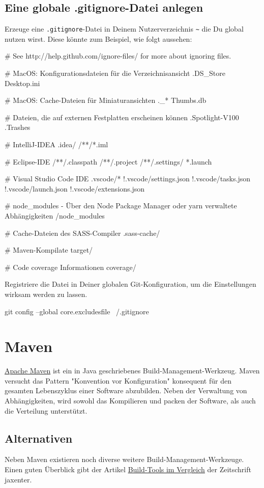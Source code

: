 \documentclass[]{article}
\newcommand{\code}[1]{\texttt{#1}}
\begin{document}
\subsection{Eine globale .gitignore-Datei anlegen}
Erzeuge eine \code{.gitignore}-Datei in Deinem Nutzerverzeichnis \code{\~} die Du global nutzen wirst. Diese könnte zum Beispiel, wie folgt aussehen:
\begin{bashcode}
 # See http://help.github.com/ignore-files/ for more about ignoring files.
 
# MacOS: Konfigurationsdateien für die Verzeichnisansicht
.DS_Store
Desktop.ini

# MacOS: Cache-Dateien für Miniaturansichten
._*
Thumbs.db

# Dateien, die auf externen Festplatten erscheinen können
.Spotlight-V100
.Trashes

# IntelliJ-IDEA
.idea/
/**/*.iml

# Eclipse-IDE
/**/.classpath
/**/.project
/**/.settings/
*.launch

 # Visual Studio Code IDE
.vscode/*
!.vscode/settings.json
!.vscode/tasks.json
!.vscode/launch.json
!.vscode/extensions.json

# node_modules - Über den Node Package Manager oder yarn verwaltete Abhängigkeiten
/node_modules

# Cache-Dateien des SASS-Compiler
.sass-cache/

# Maven-Kompilate
target/

# Code coverage Informationen
coverage/

\end{bashcode}

Registriere die Datei in Deiner globalen Git-Konfiguration, um die Einstellungen wirksam werden zu lassen.
\begin{bashcode}
git config --global core.excludesfile ~/.gitignore
\end{bashcode}

\section{Maven}
\href{https://maven.apache.org/}{Apache Maven} ist ein in Java geschriebenes Build-Management-Werkzeug. Maven versucht das Pattern "Konvention vor Konfiguration" konsequent für den gesamten Lebenszyklus einer Software abzubilden. Neben der Verwaltung von Abhängigkeiten, wird sowohl das Kompilieren und packen der Software, als auch die Verteilung unterstützt.

\subsection{Alternativen}
Neben Maven existieren noch diverse weitere Build-Management-Werkzeuge. Einen guten Überblick gibt der Artikel \href{https://jaxenter.de/8-build-tools-im-vergleich-ant-buildr-maven-bazel-buck-gradle-pants-sbt-41627}{Build-Tools im Vergleich} der Zeitschrift jaxenter.
\end{document}
